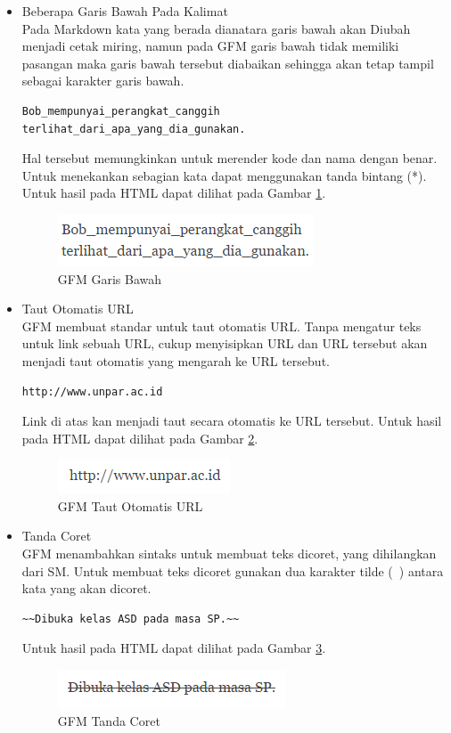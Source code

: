\begin{itemize}
\item Beberapa Garis Bawah Pada Kalimat\\
Pada Markdown kata yang berada dianatara garis bawah akan Diubah menjadi cetak miring, namun pada GFM garis bawah tidak memiliki pasangan maka garis bawah tersebut diabaikan sehingga akan tetap tampil sebagai karakter garis bawah.
\begin{lstlisting}[basicstyle=\footnotesize]
Bob_mempunyai_perangkat_canggih
terlihat_dari_apa_yang_dia_gunakan.
\end{lstlisting}
Hal tersebut memungkinkan untuk merender kode dan nama dengan benar. Untuk menekankan sebagian kata dapat menggunakan tanda bintang (*). Untuk hasil pada HTML dapat dilihat pada Gambar \ref{fig:gb}.
\begin{figure}[H]
\centering
\includegraphics[scale=1]{Gambar/garisbawah.png}
\caption[GFM Garis Bawah]{GFM Garis Bawah}
\label{fig:gb}
\end{figure}

\item Taut Otomatis URL\\
GFM membuat standar untuk taut otomatis URL. Tanpa mengatur teks untuk link sebuah URL, cukup menyisipkan URL dan URL tersebut akan menjadi taut otomatis yang mengarah ke URL tersebut.
\begin{lstlisting}[basicstyle=\footnotesize]
http://www.unpar.ac.id
\end{lstlisting}
Link di atas kan menjadi taut secara otomatis ke URL tersebut. Untuk hasil pada HTML dapat dilihat pada Gambar \ref{fig:gfml}.
\begin{figure}[H]
\centering
\includegraphics[scale=1]{Gambar/gfml.png}
\caption[GFM Taut Otomatis URL]{GFM Taut Otomatis URL}
\label{fig:gfml}
\end{figure}

\item Tanda Coret\\
GFM menambahkan sintaks untuk membuat teks dicoret, yang dihilangkan dari SM. Untuk membuat teks dicoret gunakan dua karakter tilde (~) antara kata yang akan dicoret.
\begin{lstlisting}[basicstyle=\footnotesize]
~~Dibuka kelas ASD pada masa SP.~~
\end{lstlisting}
Untuk hasil pada HTML dapat dilihat pada Gambar \ref{fig:tc}.
\begin{figure}[H]
\centering
\includegraphics[scale=1]{Gambar/tc.png}
\caption[GFM Tanda Coret]{GFM Tanda Coret}
\label{fig:tc}
\end{figure}


\end{itemize}
